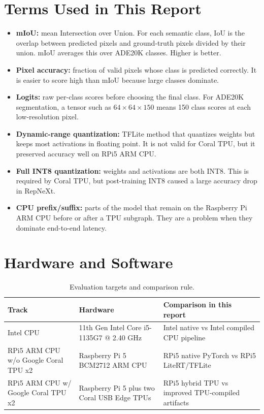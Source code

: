 \documentclass[11pt]{article}
\begin{document}
\section{Terms Used in This Report}

\begin{itemize}[leftmargin=*]
  \item \textbf{mIoU:} mean Intersection over Union. For each semantic class, IoU is the overlap between predicted pixels and ground-truth pixels divided by their union. mIoU averages this over ADE20K classes. Higher is better.
  \item \textbf{Pixel accuracy:} fraction of valid pixels whose class is predicted correctly. It is easier to score high than mIoU because large classes dominate.
  \item \textbf{Logits:} raw per-class scores before choosing the final class. For ADE20K segmentation, a tensor such as $64\times64\times150$ means 150 class scores at each low-resolution pixel.
  \item \textbf{Dynamic-range quantization:} TFLite method that quantizes weights but keeps most activations in floating point. It is not valid for Coral TPU, but it preserved accuracy well on RPi5 ARM CPU.
  \item \textbf{Full INT8 quantization:} weights and activations are both INT8. This is required by Coral TPU, but post-training INT8 caused a large accuracy drop in RepNeXt.
  \item \textbf{CPU prefix/suffix:} parts of the model that remain on the Raspberry Pi ARM CPU before or after a TPU subgraph. They are a problem when they dominate end-to-end latency.
\end{itemize}

\section{Hardware and Software}

\begin{table}[H]
\centering
\caption{Evaluation targets and comparison rule.}
\small
\begin{tabularx}{\textwidth}{Z{0.22\textwidth}Y Y}
\toprule
Track & Hardware & Comparison in this report \\
\midrule
Intel CPU & 11th Gen Intel Core i5-1135G7 @ 2.40 GHz & Intel native vs Intel compiled CPU pipeline \\
RPi5 ARM CPU w/o Google Coral TPU x2 & Raspberry Pi 5 BCM2712 ARM CPU & RPi5 native PyTorch vs RPi5 LiteRT/TFLite \\
RPi5 ARM CPU w/ Google Coral TPU x2 & Raspberry Pi 5 plus two Coral USB Edge TPUs & RPi5 hybrid TPU vs improved TPU-compiled artifacts \\
\bottomrule
\end{tabularx}
\end{table}
\end{document}
